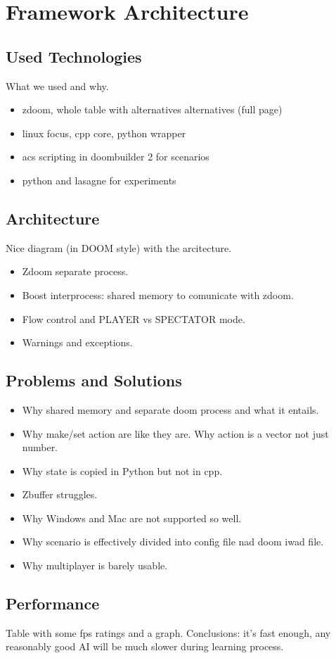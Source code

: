 
\chapter{Framework Architecture}
\label{ch:architecture}
\section{Used Technologies}
\label{sec:technologies}
What we used and why.
\begin{itemize}
\item zdoom, whole table with alternatives alternatives (full page)
\item linux focus, cpp core, python wrapper
\item acs scripting in doombuilder 2 for scenarios
\item python and lasagne for experiments
\end{itemize}

\section{Architecture}
Nice diagram (in DOOM style) with the arcitecture.
\begin{itemize}
\item Zdoom separate process.
\item Boost interprocess: shared memory to comunicate with zdoom.
\item Flow control and PLAYER vs SPECTATOR mode.
\item Warnings and exceptions.
\end{itemize}

\section{Problems and Solutions}
\begin{itemize}
\item Why shared memory and separate doom process and what it entails.
\item Why make/set action are like they are. Why action is a vector not just number.
\item Why state is copied in Python but not in cpp.
\item Zbuffer struggles.
\item Why Windows and Mac are not supported so well.
\item Why scenario is effectively divided into config file nad doom iwad file.
\item Why multiplayer is barely usable.
\end{itemize}

\section{Performance}
Table with some fps ratings and a graph.
Conclusions: it's fast enough, any reasonably good AI will be much slower during learning process.



